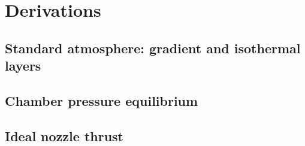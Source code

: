 \section{Derivations}\label{app:derivations}

\subsection{Standard atmosphere: gradient and isothermal layers}
\subsection{Chamber pressure equilibrium}
\subsection{Ideal nozzle thrust}
